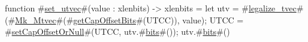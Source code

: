 function #\hyperref[sailRISCVzsetzyutvec]{set\_utvec}#(value : xlenbits) -> xlenbits = {
  let utv = #\hyperref[sailRISCVzlegalizzezytvec]{legalize\_tvec}#(#\hyperref[sailRISCVzMkzyMtvec]{Mk\_Mtvec}#(#\hyperref[sailRISCVzgetCapOffsetBits]{getCapOffsetBits}#(UTCC)), value);
  UTCC = #\hyperref[sailRISCVzsetCapOffsetOrNull]{setCapOffsetOrNull}#(UTCC, utv.#\hyperref[sailRISCVzbits]{bits}#());
  utv.#\hyperref[sailRISCVzbits]{bits}#()
}
